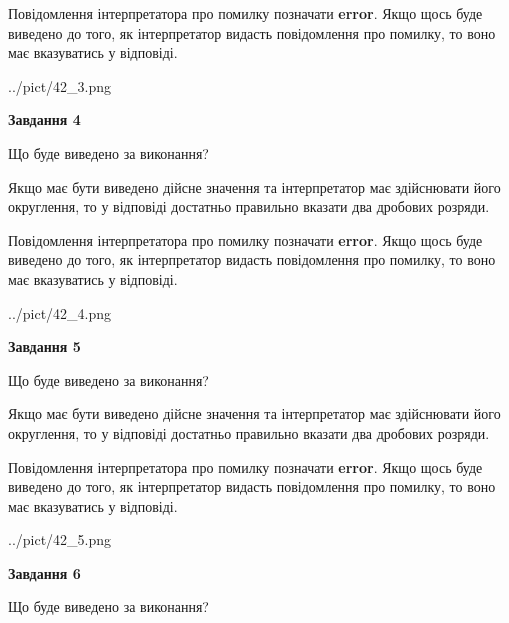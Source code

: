 \documentclass[12pt, ukrainian]{article}
\begin{document}
{\begin {Large}
Повідомлення інтерпретатора про помилку позначати \textbf{error}.
Якщо щось буде виведено до того, як інтерпретатор видасть повідомлення про помилку, 
то воно має вказуватись у відповіді. \par

\begin{center}
	{../pict/42_3.png}
\end{center}
\newpage

{\begin {center}\textbf{Завдання 4}\end {center}}\par
Що буде виведено за виконання? \par

Якщо має бути виведено дійсне значення та інтерпретатор має здійснювати його округлення, 
то у відповіді достатньо правильно вказати два дробових розряди.

Повідомлення інтерпретатора про помилку позначати \textbf{error}.
Якщо щось буде виведено до того, як інтерпретатор видасть повідомлення про помилку, 
то воно має вказуватись у відповіді. \par

\begin{center}
	{../pict/42_4.png}
\end{center}
\newpage

{\begin {center}\textbf{Завдання 5}\end {center}}\par
Що буде виведено за виконання? \par

Якщо має бути виведено дійсне значення та інтерпретатор має здійснювати його округлення, 
то у відповіді достатньо правильно вказати два дробових розряди.

Повідомлення інтерпретатора про помилку позначати \textbf{error}.
Якщо щось буде виведено до того, як інтерпретатор видасть повідомлення про помилку, 
то воно має вказуватись у відповіді. \par

\begin{center}
	{../pict/42_5.png}
\end{center}
\newpage

{\begin {center}\textbf{Завдання 6}\end {center}}\par
Що буде виведено за виконання? \par


\end{Large}}
\end{document}
